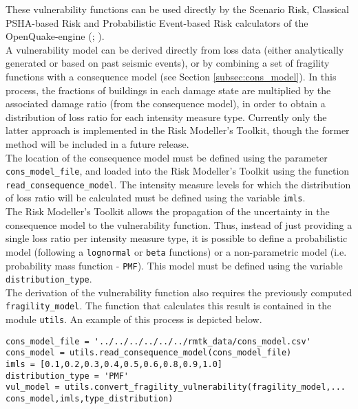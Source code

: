 These vulnerability functions can be used directly by the Scenario Risk, Classical PSHA-based Risk and Probabilistic Event-based Risk calculators of the OpenQuake-engine (\cite{SilvaEtAl2014a}; \cite{PaganiEtAl2014a}). \\

A vulnerability model can be derived directly from loss data (either analytically generated or based on past seismic events), or by combining a set of fragility functions with a consequence model (see Section \ref{subsec:cons_model}). In this process, the fractions of buildings in each damage state are multiplied by the associated damage ratio (from the consequence model), in order to obtain a distribution of loss ratio for each intensity measure type. Currently only the latter approach is implemented in the Risk Modeller's Toolkit, though the former method will be included in a future release.\\

The location of the consequence model must be defined using the parameter \verb=cons_model_file=, and loaded into the Risk Modeller's Toolkit using the function \verb=read_consequence_model=. The intensity measure levels for which the distribution of loss ratio will be calculated must be defined using the variable \verb=imls=.\\

The Risk Modeller's Toolkit allows the propagation of the uncertainty in the consequence model to the vulnerability function. Thus, instead of just providing a single loss ratio per intensity measure type, it is possible to define a probabilistic model (following a \verb=lognormal= or \verb=beta= functions) or a non-parametric model (i.e. probability mass function - \verb=PMF=). This model must be defined using the variable \verb= distribution_type=.\\

The derivation of the vulnerability function also requires the previously computed \verb=fragility_model=. The function that calculates this result is contained in the module \verb=utils=. An example of this process is depicted below.

\begin{Verbatim}[frame=single, commandchars=\\\{\}, samepage=true]
cons_model_file = '../../../../../../rmtk_data/cons_model.csv'
cons_model = utils.read_consequence_model(cons_model_file)
imls = [0.1,0.2,0.3,0.4,0.5,0.6,0.8,0.9,1.0]
distribution_type = 'PMF'
vul_model = utils.convert_fragility_vulnerability(fragility_model,...
cons_model,imls,type_distribution)
\end{Verbatim}


